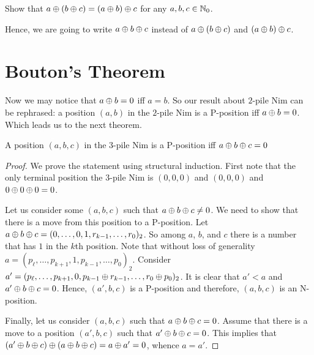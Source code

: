\begin{exercise}
  Show that $a \oplus (b \oplus c) = (a \oplus b) \oplus c$
  for any $a, b, c \in {\mathbb{N}}_0$.
\end{exercise}
Hence, we are going to write $a \oplus b \oplus c$ instead of
$a \oplus (b \oplus c)$ and $(a \oplus b) \oplus c$.

\section{Bouton's Theorem}

Now we may notice that $a \oplus b = 0$ iff $a = b$. So
our result about $2$-pile Nim can be rephrased:
a position $(a, b)$ in the $2$-pile Nim is a P-position iff
$a \oplus b = 0$. Which leads us to the next theorem.
\begin{theorem}[Bouton]
\label{theorem:bouton}
  A position $(a, b, c)$ in the $3$-pile Nim is a P-position iff
  $a \oplus b \oplus c = 0$
\end{theorem}
\begin{proof}
  We prove the statement using structural induction.
  First note that the only terminal position the $3$-pile Nim is $(0, 0, 0)$
  and $(0, 0, 0)$ and $0 \oplus 0 \oplus 0 = 0$.

  Let us consider
  some $(a, b, c)$ such that $a \oplus b \oplus c \neq 0$.
  We need to show that there is a move from this position to a P-position.
  Let $a \oplus b \oplus c =
      (0, \dots, 0, 1, r_{k - 1}, \dots, r_0)_2$. So among $a$, $b$, and $c$
  there is a number that has $1$ in the $k$th position.
  Note that without loss of generality
  $a = (p_\ell, \dots, p_{k + 1}, 1, p_{k - 1}, \dots, p_0)_2$.
  Consider $a' = (p_\ell, \dots, p_{k + 1}, 0,
    p_{k - 1} \oplus r_{k - 1}, \dots, r_0 \oplus p_0)_2$. It is clear that
  $a' < a$ and $a' \oplus b \oplus c = 0$.
  Hence, $(a', b, c)$ is a P-position and therefore, $(a, b, c)$ is an
  N-position.

  Finally, let us consider $(a, b, c)$ such that
  $a \oplus b \oplus c = 0$. Assume that there is a move to a
  position $(a', b, c)$ such that $a' \oplus b \oplus c = 0$.
  This implies that
  $(a' \oplus b \oplus c) \oplus
      (a \oplus b \oplus c) =  a \oplus a' = 0$, whence $a = a'$.
\end{proof}

